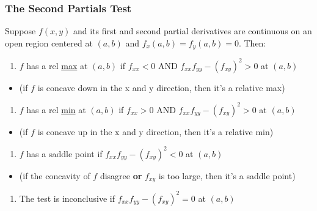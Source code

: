 \documentclass[
  letterpaper,
  DIV=11,
  numbers=noendperiod]{scrartcl}
\providecommand{\tightlist}{%
  \setlength{\itemsep}{0pt}\setlength{\parskip}{0pt}}\usepackage{longtable,booktabs,array}
\begin{document}
\subsubsection{The Second Partials Test}\label{the-second-partials-test}

Suppose \(f(x,y)\) and its first and second partial derivatives are
continuous on an open region centered at \((a, b)\) and
\(f_x(a, b) = f_y(a, b) = 0\). Then:

\begin{enumerate}
\def\labelenumi{\alph{enumi})}
\tightlist
\item
  \(f\) has a rel \ul{max} at \((a, b)\) if \(f_{xx} < 0\) AND
  \(f_{xx}f_{yy}-(f_{xy})^2 > 0\) at \((a, b)\)
\end{enumerate}

\begin{itemize}
\tightlist
\item
  (if \(f\) is concave down in the x and y direction, then it's a
  relative max)
\end{itemize}

\begin{enumerate}
\def\labelenumi{\alph{enumi})}
\setcounter{enumi}{1}
\tightlist
\item
  \(f\) has a rel \ul{min} at \((a, b)\) if \(f_{xx} > 0\) AND
  \(f_{xx}f_{yy}-(f_{xy})^2 > 0\) at \((a, b)\)
\end{enumerate}

\begin{itemize}
\tightlist
\item
  (if \(f\) is concave up in the x and y direction, then it's a relative
  min)
\end{itemize}

\begin{enumerate}
\def\labelenumi{\alph{enumi})}
\setcounter{enumi}{2}
\tightlist
\item
  \(f\) has a saddle point if \(f_{xx}f_{yy} - (f_{xy})^2 < 0\) at
  \((a, b)\)
\end{enumerate}

\begin{itemize}
\tightlist
\item
  (if the concavity of \(f\) disagree \textbf{or} \(f_{xy}\) is too
  large, then it's a saddle point)
\end{itemize}

\begin{enumerate}
\def\labelenumi{\alph{enumi})}
\setcounter{enumi}{3}
\tightlist
\item
  The test is inconclusive if \(f_{xx}f_{yy} - (f_{xy})^2 = 0\) at
  \((a, b)\)
\end{enumerate}
\end{document}
